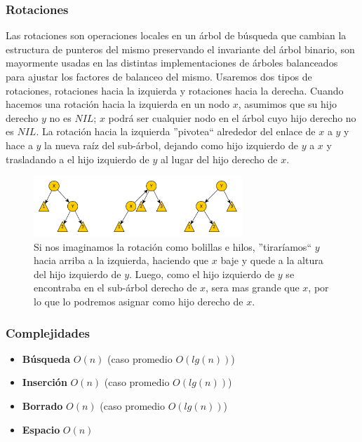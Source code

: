 \documentclass[10pt, a4paper]{report}
\begin{document}

\subsubsection{Rotaciones}

Las rotaciones son operaciones locales en un \'arbol de b\'usqueda que cambian la estructura de punteros del mismo preservando el invariante del \'arbol binario, son mayormente usadas en las distintas implementaciones de \'arboles balanceados para ajustar los factores de balanceo del mismo. Usaremos dos tipos de rotaciones, rotaciones hacia la izquierda y rotaciones hacia la derecha. Cuando hacemos una rotaci\'on hacia la izquierda en un nodo $x$, asumimos que su hijo derecho $y$ no es $NIL$; $x$ podr\'a ser cualquier nodo en el \'arbol cuyo hijo derecho no es $NIL$. La rotaci\'on hacia la izquierda ''pivotea`` alrededor del enlace de $x$ a $y$ y hace a $y$ la nueva ra\'iz del sub-\'arbol, dejando como hijo izquierdo de $y$ a $x$ y trasladando a el hijo izquierdo de $y$ al lugar del hijo derecho de $x$. 

\begin{figure}
 \centering
 \includegraphics[width=0.7\textwidth]{RBRotacionIzq.pdf}
 \caption*{\newline \footnotesize Si nos imaginamos la rotaci\'on como bolillas e hilos, ''tirar\'iamos`` $y$ hacia arriba a la izquierda, haciendo que $x$ baje y quede a la altura del hijo izquierdo de $y$. Luego, como el hijo izquierdo de $y$ se encontraba en el sub-\'arbol derecho de $x$, sera mas grande que $x$, por lo que lo podremos asignar como hijo derecho de $x$.}
\end{figure}



\subsubsection{Complejidades}

\begin{itemize}
 \item \textbf{B\'usqueda} $O(n)$ (caso promedio $O(lg(n))$)
 \item \textbf{Inserci\'on} $O(n)$ (caso promedio $O(lg(n))$)
 \item \textbf{Borrado} $O(n)$ (caso promedio $O(lg(n))$)
 \item \textbf{Espacio} $O(n)$
\end{itemize}
\end{document}
